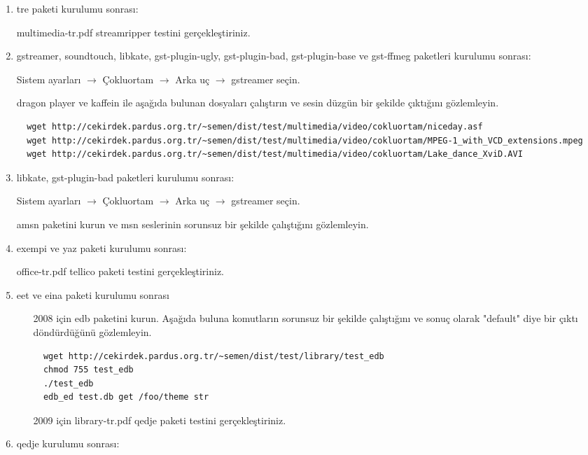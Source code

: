 \documentclass[a4paper,10pt]{article}
\begin{document}
\begin{enumerate}
\item tre paketi kurulumu sonrası:

multimedia-tr.pdf streamripper testini gerçekleştiriniz.

\item gstreamer, soundtouch, libkate, gst-plugin-ugly, gst-plugin-bad, gst-plugin-base ve gst-ffmeg paketleri kurulumu sonrası:

Sistem ayarları $\rightarrow$ Çokluortam $\rightarrow$ Arka uç $\rightarrow$ gstreamer seçin. 

dragon player ve kaffein ile aşağıda bulunan dosyaları çalıştırın ve sesin düzgün bir şekilde çıktığını gözlemleyin.
\begin{verbatim}
  wget http://cekirdek.pardus.org.tr/~semen/dist/test/multimedia/video/cokluortam/niceday.asf
  wget http://cekirdek.pardus.org.tr/~semen/dist/test/multimedia/video/cokluortam/MPEG-1_with_VCD_extensions.mpeg
  wget http://cekirdek.pardus.org.tr/~semen/dist/test/multimedia/video/cokluortam/Lake_dance_XviD.AVI
\end{verbatim}

\item libkate, gst-plugin-bad paketleri kurulumu sonrası:

Sistem ayarları $\rightarrow$ Çokluortam $\rightarrow$ Arka uç $\rightarrow$ gstreamer seçin. 

amsn paketini kurun ve msn seslerinin sorunsuz bir şekilde çalıştığını gözlemleyin.


\item exempi ve yaz paketi kurulumu sonrası:

office-tr.pdf tellico paketi testini gerçekleştiriniz.

\item eet ve eina paketi kurulumu sonrası
\begin{itemize}
 \item [2008 için] edb paketini kurun. Aşağıda buluna komutların sorunsuz bir şekilde çalıştığını ve sonuç olarak "default" diye bir çıktı döndürdüğünü gözlemleyin.
\begin{verbatim}
  wget http://cekirdek.pardus.org.tr/~semen/dist/test/library/test_edb
  chmod 755 test_edb
  ./test_edb
  edb_ed test.db get /foo/theme str
\end{verbatim}
\item [2009 için] library-tr.pdf qedje paketi testini gerçekleştiriniz.
\end{itemize}

\item qedje kurulumu sonrası:


\end{enumerate}
\end{document}
